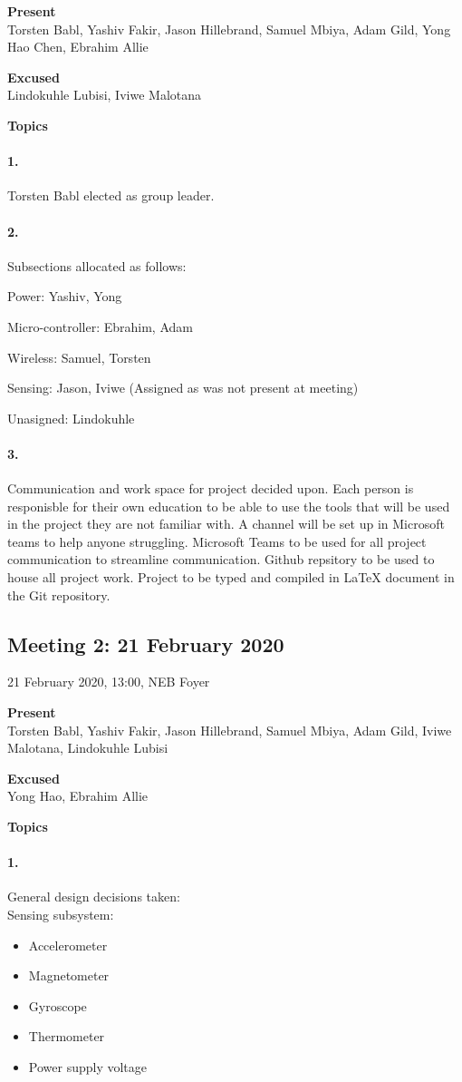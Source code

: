 \documentclass[12pt]{article}
\begin{document}
\textbf{Present}\\
Torsten Babl, Yashiv Fakir, Jason Hillebrand, Samuel Mbiya, Adam Gild, Yong Hao Chen, Ebrahim Allie

\textbf{Excused}\\
Lindokuhle Lubisi, Iviwe Malotana

\textbf{Topics}
\paragraph[short]{1.} Torsten Babl elected as group leader.
\paragraph[short]{2.} Subsections allocated as follows:

Power: Yashiv, Yong

Micro-controller:	Ebrahim, Adam

Wireless:	Samuel,	Torsten

Sensing: Jason, Iviwe (Assigned as was not present at meeting)
  
Unasigned: Lindokuhle

\paragraph[short]{3.} Communication and work space for project decided upon. Each person is responisble for their own education to be able to use the tools that will be used in the project they are not familiar with. A channel will be set up in Microsoft teams to help anyone struggling.  
Microsoft Teams to be used for all project communication to streamline communication.
Github repsitory to be used to house all project work.
Project to be typed and compiled in LaTeX document in the Git repository.
\newpage

\subsection{Meeting 2: 21 February 2020}
21 February 2020, 13:00, NEB Foyer

\textbf{Present}\\
Torsten Babl, Yashiv Fakir, Jason Hillebrand, Samuel Mbiya, Adam Gild, Iviwe Malotana, Lindokuhle Lubisi

\textbf{Excused}\\
Yong Hao, Ebrahim Allie

\textbf{Topics}
\paragraph[short]{1.} General design decisions taken:\\
Sensing subsystem:
\begin{itemize}
  \item Accelerometer
  \item Magnetometer
  \item Gyroscope
  \item Thermometer
  \item Power supply voltage
\end{itemize}
\end{document}
